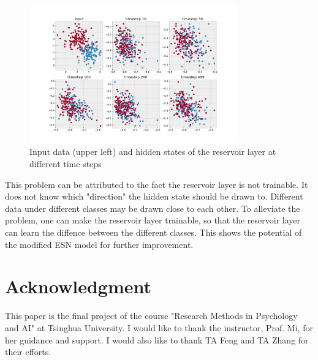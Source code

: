 \documentclass{article}
\begin{document}
\begin{figure}[htbp]
    \centering
    \includegraphics[width=0.8\textwidth]{assets/attractor_problem.png}
    \caption{Input data (upper left) and hidden states of the reservoir layer at different time steps}
    \label{fig:attractor_problem}
\end{figure}

This problem can be attributed to the fact the reservoir layer is not trainable. It does not know which "direction" the hidden state should be drawn to.
Different data under different classes may be drawn close to each other. To alleviate the problem, one can make the reservoir layer trainable, so that 
the reservoir layer can learn the diffence between the different classes. This shows the potential of the modified ESN model for further improvement.

\clearpage

\section*{Acknowledgment}

This paper is the final project of the course "Research Methods in Psychology and AI" at Tsinghua University.
I would like to thank the instructor, Prof. Mi, for her guidance and support. I would also like to 
thank TA Feng and TA Zhang for their efforts.


\end{document}
